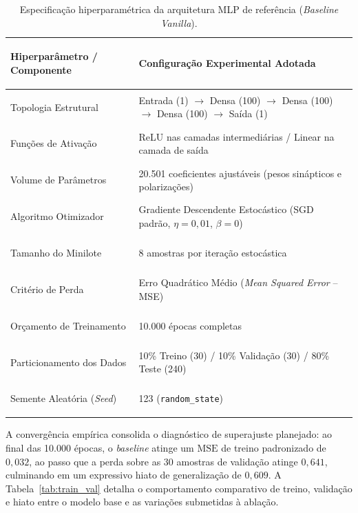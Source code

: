 \documentclass[11pt,a4paper]{article}
\begin{document}
\begin{table}[htbp]
\centering
\small
\renewcommand{\arraystretch}{1.15}
\caption{Especificação hiperparamétrica da arquitetura MLP de referência (\textit{Baseline Vanilla}).}
\label{tab:baseline_hiper}
\begin{tabularx}{\textwidth}{>{\bfseries\raggedright\arraybackslash}p{4.8cm} X}
\toprule
Hiperparâmetro / Componente & Configuração Experimental Adotada \\
\midrule
Topologia Estrutural & Entrada (1) $\to$ Densa (100) $\to$ Densa (100) $\to$ Densa (100) $\to$ Saída (1) \\
Funções de Ativação & ReLU nas camadas intermediárias / Linear na camada de saída \\
Volume de Parâmetros & 20.501 coeficientes ajustáveis (pesos sinápticos e polarizações) \\
Algoritmo Otimizador & Gradiente Descendente Estocástico (SGD padrão, $\eta = 0{,}01$, $\beta = 0$) \\
Tamanho do Minilote & 8 amostras por iteração estocástica \\
Critério de Perda & Erro Quadrático Médio (\textit{Mean Squared Error} -- MSE) \\
Orçamento de Treinamento & 10.000 épocas completas \\
Particionamento dos Dados & 10\% Treino (30) / 10\% Validação (30) / 80\% Teste (240) \\
Semente Aleatória (\textit{Seed}) & 123 (\texttt{random\_state}) \\
\bottomrule
\end{tabularx}
\end{table}

A convergência empírica consolida o diagnóstico de superajuste planejado: ao final das 10.000 épocas, o \textit{baseline} atinge um $\mathrm{MSE}$ de treino padronizado de $0{,}032$, ao passo que a perda sobre as 30 amostras de validação atinge $0{,}641$, culminando em um expressivo hiato de generalização de $0{,}609$. A Tabela~\ref{tab:train_val} detalha o comportamento comparativo de treino, validação e hiato entre o modelo base e as variações submetidas à ablação.
\end{document}
